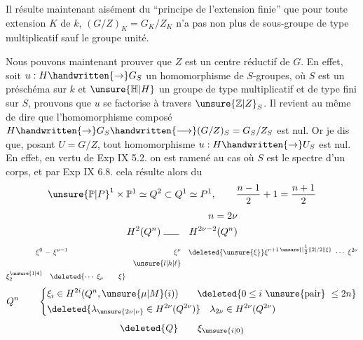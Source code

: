 Il résulte maintenant aisément du \textquotedblleft principe de l'extension finie'' que pour toute extension $K$ de $k$, $(G/Z)_K=G_K/Z_K$ n'a pas non plus de sous-groupe de type multiplicatif sauf le groupe unité.

Nous pouvons maintenant prouver que $Z$ est un centre réductif de $G$. En effet, soit $u:H\handwritten{\to}G_S$ un homomorphisme de $S$-groupes, où $S$ est un préschéma sur $k$ et $\unsure{\mathbb H|H}$ un groupe de type multiplicatif et de type fini sur $S$, prouvons que $u$ se factorise à travers $\unsure{\mathbb Z|Z}_S$. Il revient au même de dire que l'homomorphisme composé $H\handwritten{\to}G_S\handwritten{\longrightarrow}(G/Z)_S=G_S/Z_S$ est nul. Or je dis que, posant $U=G/Z$, tout homomorphisme $u:H\handwritten{\to}U_S$ est nul. En effet, en vertu de Exp IX 5.2. on est ramené au cas où $S$ est le spectre d'un corps, et par Exp IX 6.8. cela résulte alors du
\[
\unsure{\mathbb P|P}^1\times\mathbb P^1\simeq Q^2\subset Q^1\simeq P^1,\qquad
\frac{n-1}{2}+1=\frac{n+1}{2}
\]
\[
\begin{aligned}
&& n=2\nu\\
H^2(Q^n)&\mathrel{\rule{1.6em}{.35pt}}& H^{2\nu-2}(Q^n)
\end{aligned}
\]
\[
\begin{aligned}
\xi^{0}&\ \mathord{-}\ \xi^{\nu-1}&\xi^\nu&\quad \deleted{\unsure{\xi}}\xi^{\nu+1\,\unsure{[\tfrac12|[2|/2|[\xi}}\ \cdots\ \xi^{2\nu}\\
&&\unsure{l|h|\ell}&\\
\xi^{\unsure{1|4}}_{2}&\quad \deleted{\cdots\ \xi_{\nu}\qquad\xi}&&
\end{aligned}
\]
\[
Q^n\qquad\left\{\begin{aligned}
&\xi_i\in H^{2i}(Q^n,\unsure{\mu|M}(i))\qquad\deleted{0\leq i\ \unsure{\text{pair}}\ \leq2n}\\
&\deleted{\lambda_{\unsure{2\nu|\nu}}\in H^{2\nu}(Q^{2\nu})}\quad\lambda_{2\nu}\in H^{2\nu}(Q^{2\nu})
\end{aligned}\right.
\]
\[
\deleted{Q}\qquad \xi_{\unsure{i|0}}
\]

